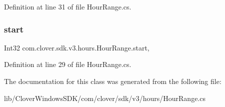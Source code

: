 Definition at line 31 of file Hour\+Range.\+cs.

\mbox{\label{classcom_1_1clover_1_1sdk_1_1v3_1_1hours_1_1_hour_range_a60dfdcfa17bb5b0e7ef47fdf5b3d6cde}} 
\subsubsection{\texorpdfstring{start}{start}}
{\footnotesize\ttfamily Int32 com.\+clover.\+sdk.\+v3.\+hours.\+Hour\+Range.\+start\hspace{0.3cm}{\ttfamily [get]}, {\ttfamily [set]}}



Definition at line 29 of file Hour\+Range.\+cs.



The documentation for this class was generated from the following file\+:\begin{DoxyCompactItemize}
\item 
lib/\+Clover\+Windows\+S\+D\+K/com/clover/sdk/v3/hours/Hour\+Range.\+cs\end{DoxyCompactItemize}
